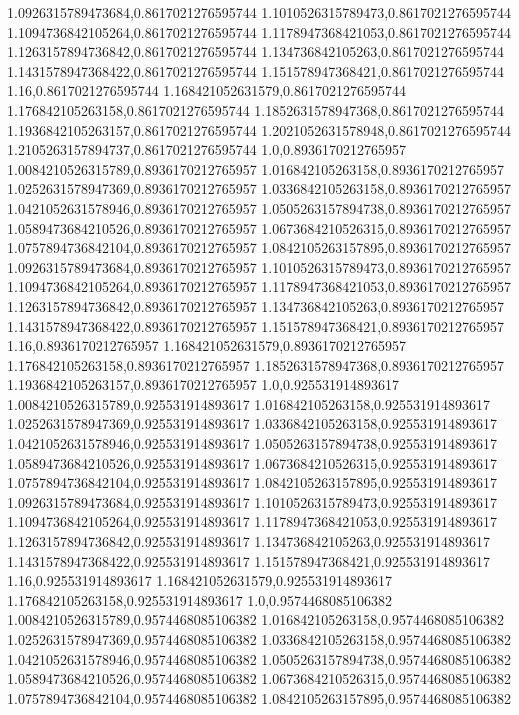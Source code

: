 1.0926315789473684,0.8617021276595744
1.1010526315789473,0.8617021276595744
1.1094736842105264,0.8617021276595744
1.1178947368421053,0.8617021276595744
1.1263157894736842,0.8617021276595744
1.134736842105263,0.8617021276595744
1.1431578947368422,0.8617021276595744
1.151578947368421,0.8617021276595744
1.16,0.8617021276595744
1.168421052631579,0.8617021276595744
1.176842105263158,0.8617021276595744
1.1852631578947368,0.8617021276595744
1.1936842105263157,0.8617021276595744
1.2021052631578948,0.8617021276595744
1.2105263157894737,0.8617021276595744
1.0,0.8936170212765957
1.0084210526315789,0.8936170212765957
1.016842105263158,0.8936170212765957
1.0252631578947369,0.8936170212765957
1.0336842105263158,0.8936170212765957
1.0421052631578946,0.8936170212765957
1.0505263157894738,0.8936170212765957
1.0589473684210526,0.8936170212765957
1.0673684210526315,0.8936170212765957
1.0757894736842104,0.8936170212765957
1.0842105263157895,0.8936170212765957
1.0926315789473684,0.8936170212765957
1.1010526315789473,0.8936170212765957
1.1094736842105264,0.8936170212765957
1.1178947368421053,0.8936170212765957
1.1263157894736842,0.8936170212765957
1.134736842105263,0.8936170212765957
1.1431578947368422,0.8936170212765957
1.151578947368421,0.8936170212765957
1.16,0.8936170212765957
1.168421052631579,0.8936170212765957
1.176842105263158,0.8936170212765957
1.1852631578947368,0.8936170212765957
1.1936842105263157,0.8936170212765957
1.0,0.925531914893617
1.0084210526315789,0.925531914893617
1.016842105263158,0.925531914893617
1.0252631578947369,0.925531914893617
1.0336842105263158,0.925531914893617
1.0421052631578946,0.925531914893617
1.0505263157894738,0.925531914893617
1.0589473684210526,0.925531914893617
1.0673684210526315,0.925531914893617
1.0757894736842104,0.925531914893617
1.0842105263157895,0.925531914893617
1.0926315789473684,0.925531914893617
1.1010526315789473,0.925531914893617
1.1094736842105264,0.925531914893617
1.1178947368421053,0.925531914893617
1.1263157894736842,0.925531914893617
1.134736842105263,0.925531914893617
1.1431578947368422,0.925531914893617
1.151578947368421,0.925531914893617
1.16,0.925531914893617
1.168421052631579,0.925531914893617
1.176842105263158,0.925531914893617
1.0,0.9574468085106382
1.0084210526315789,0.9574468085106382
1.016842105263158,0.9574468085106382
1.0252631578947369,0.9574468085106382
1.0336842105263158,0.9574468085106382
1.0421052631578946,0.9574468085106382
1.0505263157894738,0.9574468085106382
1.0589473684210526,0.9574468085106382
1.0673684210526315,0.9574468085106382
1.0757894736842104,0.9574468085106382
1.0842105263157895,0.9574468085106382
